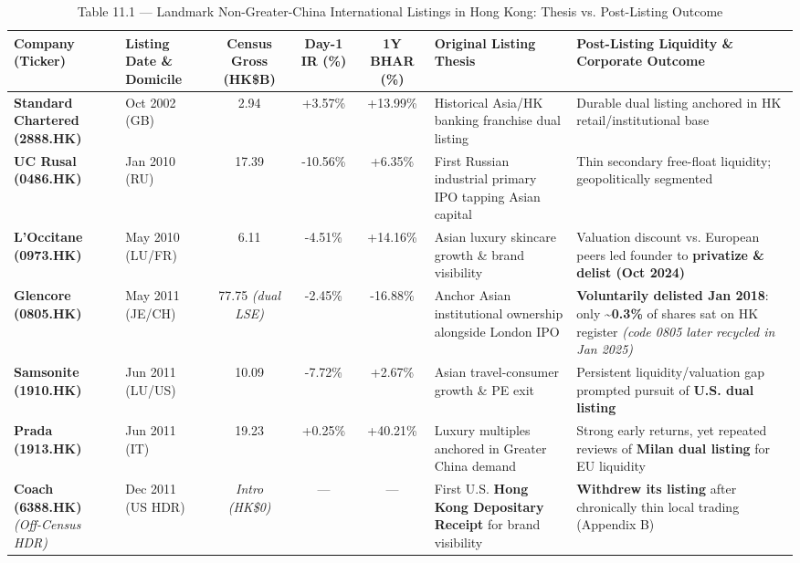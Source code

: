\documentclass[11pt,letterpaper]{article}
\begin{document}
\begin{table}[!htbp]
\centering
\caption*{Table 11.1 — Landmark Non-Greater-China International Listings in Hong Kong: Thesis vs. Post-Listing Outcome}
\begin{adjustbox}{max width=\textwidth,max totalheight=0.79\textheight}
\begin{minipage}{\textwidth}\centering
\footnotesize
\setlength{\tabcolsep}{3.5pt}
\renewcommand{\arraystretch}{1.18}
\begin{adjustbox}{max width=\textwidth}
\begin{tabular}{>{\raggedright\arraybackslash}p{2.46cm}>{\centering\arraybackslash}p{1.90cm}ccc>{\raggedright\arraybackslash}p{3.88cm}>{\raggedright\arraybackslash}p{3.88cm}}
\toprule
Company (Ticker) & Listing Date \& Domicile & Census Gross (HK\$B) & Day-1 IR (\%) & 1Y BHAR (\%) & Original Listing Thesis & Post-Listing Liquidity \& Corporate Outcome \\
\midrule
\textbf{Standard Chartered (2888.HK)} & Oct 2002 (GB) & 2.94 & +3.57\% & +13.99\% & Historical Asia/HK banking franchise dual listing & Durable dual listing anchored in HK retail/institutional base \\
\textbf{UC Rusal (0486.HK)} & Jan 2010 (RU) & 17.39 & -10.56\% & +6.35\% & First Russian industrial primary IPO tapping Asian capital & Thin secondary free-float liquidity; geopolitically segmented \\
\textbf{L’Occitane (0973.HK)} & May 2010 (LU/FR) & 6.11 & -4.51\% & +14.16\% & Asian luxury skincare growth \& brand visibility & Valuation discount vs. European peers led founder to \textbf{privatize \& delist (Oct 2024)} \\
\textbf{Glencore (0805.HK)} & May 2011 (JE/CH) & 77.75 \textit{(dual LSE)} & -2.45\% & -16.88\% & Anchor Asian institutional ownership alongside London IPO & \textbf{Voluntarily delisted Jan 2018}: only \textbf{\textasciitilde{}0.3\%} of shares sat on HK register \textit{(code 0805 later recycled in Jan 2025)} \\
\textbf{Samsonite (1910.HK)} & Jun 2011 (LU/US) & 10.09 & -7.72\% & +2.67\% & Asian travel-consumer growth \& PE exit & Persistent liquidity/valuation gap prompted pursuit of \textbf{U.S. dual listing} \\
\textbf{Prada (1913.HK)} & Jun 2011 (IT) & 19.23 & +0.25\% & +40.21\% & Luxury multiples anchored in Greater China demand & Strong early returns, yet repeated reviews of \textbf{Milan dual listing} for EU liquidity \\
\textbf{Coach (6388.HK)} \textit{(Off-Census HDR)} & Dec 2011 (US HDR) & \textit{Intro (HK\$0)} & — & — & First U.S. \textbf{Hong Kong Depositary Receipt} for brand visibility & \textbf{Withdrew its listing} after chronically thin local trading (Appendix B) \\

\end{tabular}
\end{adjustbox}
\end{minipage}
\end{adjustbox}
\end{table}
\end{document}
